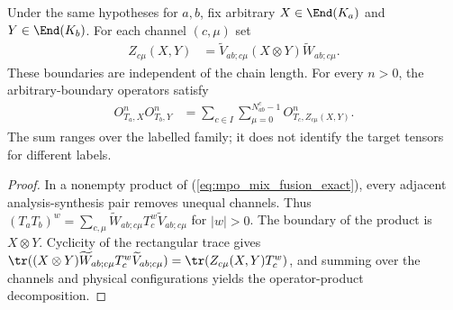 \begin{lemma}
    \label{thm:mpo_mixed_fusion_boundary}
    \leanok
    Under the same hypotheses for $a,b$, fix arbitrary
    $X\in\End(K_a)$ and $Y\in\End(K_b)$. For each channel $(c,\mu)$ set
    \begin{align}
        Z_{c\mu}(X,Y) & =\widetilde V_{ab;c\mu}(X\otimes Y)
        \widetilde W_{ab;c\mu}.
        \label{eq:mpo_mix_fusion_boundary}
    \end{align}
    These boundaries are independent of the chain length. For every
    $n>0$, the arbitrary-boundary operators satisfy
    \begin{align}
        O^n_{T_a,X}O^n_{T_b,Y}
         & =\sum_{c\in I}\sum_{\mu=0}^{N_{ab}^c-1}
        O^n_{T_c,Z_{c\mu}(X,Y)}.
        \label{eq:mpo_mix_fusion_family}
    \end{align}
    The sum ranges over the labelled family; it does not identify
    the target tensors for different labels.
\end{lemma}
\begin{proof}
    \leanok
    In a nonempty product of (\ref{eq:mpo_mix_fusion_exact}), every
    adjacent analysis-synthesis pair removes unequal channels. Thus
    $(T_aT_b)^w=\sum_{c,\mu}\widetilde W_{ab;c\mu}T_c^w
        \widetilde V_{ab;c\mu}$ for $|w|>0$.
    The boundary of the product is $X\otimes Y$. Cyclicity of the
    rectangular trace gives
    $\tr((X\otimes Y)\widetilde W_{ab;c\mu}T_c^w
        \widetilde V_{ab;c\mu})=\tr(Z_{c\mu}(X,Y)T_c^w)$,
    and summing over the channels and physical configurations yields
    the operator-product decomposition.
\end{proof}

